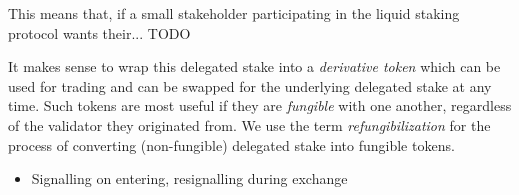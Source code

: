This means that, if a small stakeholder
participating in the liquid staking protocol wants their... TODO

It makes sense to wrap this delegated
stake into a \emph{derivative token} which can be used for trading and can
be swapped for the underlying delegated stake at any time. Such tokens
are most useful if they are \emph{fungible} with one another, regardless
of the validator they originated from. We use the term
\emph{refungibilization} for the process of converting (non-fungible) delegated stake
into fungible tokens.

\begin{itemize}
    \item Signalling on entering, resignalling during exchange
\end{itemize}

